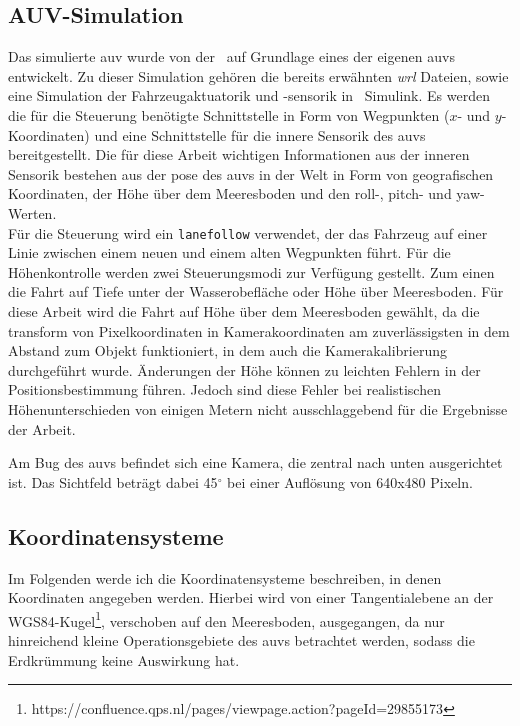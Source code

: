 \subsection{AUV-Simulation}
\label{sec_auvSimGrundlage}
Das simulierte \gls{auv} wurde von der \atlas\ auf Grundlage eines der eigenen \gls{auv}s entwickelt. Zu dieser Simulation gehören die bereits erwähnten \textit{wrl} Dateien, sowie eine Simulation der Fahrzeugaktuatorik und -sensorik in \matlab\ Simulink. Es werden die für die Steuerung benötigte Schnittstelle in Form von Wegpunkten ($x$- und $y$-Koordinaten) und eine Schnittstelle für die innere Sensorik des \gls{auv}s bereitgestellt. Die für diese Arbeit wichtigen Informationen aus der inneren Sensorik bestehen aus der \gls{pose} des \gls{auv}s in der Welt in Form von geografischen Koordinaten, der Höhe über dem Meeresboden und den \gls{roll}-, \gls{pitch}- und \gls{yaw}-Werten.\\
Für die Steuerung wird ein \texttt{\gls{lanefollow}} verwendet, der das Fahrzeug auf einer Linie zwischen einem neuen und einem alten Wegpunkten führt. Für die Höhenkontrolle werden zwei Steuerungsmodi zur Verfügung gestellt. Zum einen die Fahrt auf Tiefe unter der Wasserobefläche oder Höhe über Meeresboden. Für diese Arbeit wird die Fahrt auf Höhe über dem Meeresboden gewählt, da die \gls{transform} von Pixelkoordinaten in Kamerakoordinaten am zuverlässigsten in dem Abstand zum Objekt funktioniert, in dem auch die Kamerakalibrierung durchgeführt wurde. Änderungen der Höhe können zu leichten Fehlern in der Positionsbestimmung führen. Jedoch sind diese Fehler bei realistischen Höhenunterschieden von einigen Metern nicht ausschlaggebend für die Ergebnisse der Arbeit.

Am Bug des \gls{auv}s befindet sich eine Kamera, die zentral nach unten ausgerichtet ist. Das Sichtfeld beträgt dabei 45$^\circ$ bei einer Auflösung von 640x480 Pixeln.
\subsection{Koordinatensysteme}
\label{sec_coordsystems}
Im Folgenden werde ich die Koordinatensysteme beschreiben, in denen Koordinaten angegeben werden. Hierbei wird von einer Tangentialebene an der WGS84-Kugel\footnote{https://confluence.qps.nl/pages/viewpage.action?pageId=29855173}, verschoben auf den Meeresboden, ausgegangen, da nur hinreichend kleine Operationsgebiete des \gls{auv}s betrachtet werden, sodass die Erdkrümmung keine Auswirkung hat.
